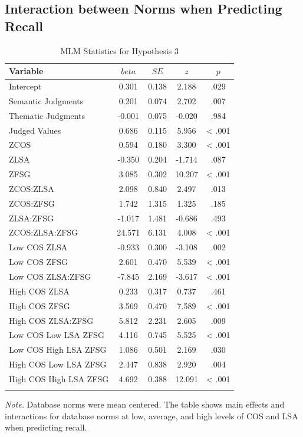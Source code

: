 \documentclass[english,,man]{apa6}
\begin{document}
\subsection{Interaction between Norms when Predicting
Recall}\label{interaction-between-norms-when-predicting-recall}

\begin{table}[tbp]
\begin{center}
\begin{threeparttable}
\caption{\label{tab:hyp3-table}MLM Statistics for Hypothesis 3}
\small{
\begin{tabular}{lcccc}
\toprule
Variable & \multicolumn{1}{c}{$beta$} & \multicolumn{1}{c}{$SE$} & \multicolumn{1}{c}{$z$} & \multicolumn{1}{c}{$p$}\\
\midrule
Intercept & 0.301 & 0.138 & 2.188 & .029\\
Semantic Judgments & 0.201 & 0.074 & 2.702 & .007\\
Thematic Judgments & -0.001 & 0.075 & -0.020 & .984\\
Judged Values & 0.686 & 0.115 & 5.956 & < .001\\
ZCOS & 0.594 & 0.180 & 3.300 & < .001\\
ZLSA & -0.350 & 0.204 & -1.714 & .087\\
ZFSG & 3.085 & 0.302 & 10.207 & < .001\\
ZCOS:ZLSA & 2.098 & 0.840 & 2.497 & .013\\
ZCOS:ZFSG & 1.742 & 1.315 & 1.325 & .185\\
ZLSA:ZFSG & -1.017 & 1.481 & -0.686 & .493\\
ZCOS:ZLSA:ZFSG & 24.571 & 6.131 & 4.008 & < .001\\
Low COS ZLSA & -0.933 & 0.300 & -3.108 & .002\\
Low COS ZFSG & 2.601 & 0.470 & 5.539 & < .001\\
Low COS ZLSA:ZFSG & -7.845 & 2.169 & -3.617 & < .001\\
High COS ZLSA & 0.233 & 0.317 & 0.737 & .461\\
High COS ZFSG & 3.569 & 0.470 & 7.589 & < .001\\
High COS ZLSA:ZFSG & 5.812 & 2.231 & 2.605 & .009\\
Low COS Low LSA ZFSG & 4.116 & 0.745 & 5.525 & < .001\\
Low COS High LSA ZFSG & 1.086 & 0.501 & 2.169 & .030\\
High COS Low LSA ZFSG & 2.447 & 0.838 & 2.920 & .004\\
High COS High LSA ZFSG & 4.692 & 0.388 & 12.091 & < .001\\
\bottomrule
\addlinespace
\end{tabular}
}
\begin{tablenotes}[para]
\normalsize{\textit{Note.} Database norms were mean centered. The table shows main effects and interactions for database norms at low, average, and high levels of COS and LSA when predicting recall.}
\end{tablenotes}
\end{threeparttable}
\end{center}
\end{table}
\end{document}
